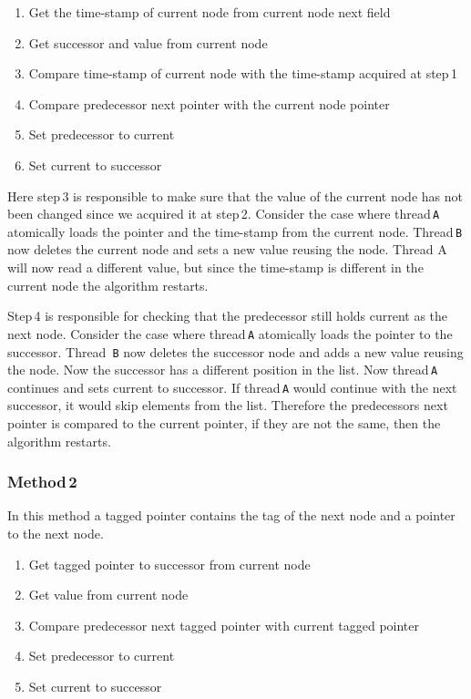 \documentclass{article}
\begin{document}
\begin{enumerate}
\item Get the time-stamp of current node from current node next field
\item Get successor and value from current node
\item Compare time-stamp of current node with the time-stamp acquired at step\,1
\item Compare predecessor next pointer with the current node pointer
\item Set predecessor to current
\item Set current to successor
\end{enumerate}

Here step\,3 is responsible to make sure that the value of the current node has not been changed since we acquired it at step\,2.
Consider the case where thread\,\texttt{A} atomically loads the pointer and the time-stamp from the current node.
Thread\,\texttt{B} now deletes the current node and sets a new value reusing the node.
Thread A will now read a different value, but since the time-stamp is different in the current node the algorithm restarts.

Step\,4 is responsible for checking that the predecessor still holds current as the next node.
Consider the case where thread\,\texttt{A} atomically loads the pointer to the successor.
Thread \,\texttt{B} now deletes the successor node and adds a new value reusing the node.
Now the successor has a different position in the list.
Now thread\,\texttt{A} continues and sets current to successor.
If thread\,\texttt{A} would continue with the next successor, it would skip elements from the list.
Therefore the predecessors next pointer is compared to the current pointer, if they are not the same, then the algorithm restarts.

\subsubsection*{Method\,2}

In this method a tagged pointer contains the tag of the next node and a pointer to the next node.

\begin{enumerate}
\item Get tagged pointer to successor from current node
\item Get value from current node
\item Compare predecessor next tagged pointer with current tagged pointer
\item Set predecessor to current
\item Set current to successor
\end{enumerate}
\end{document}
